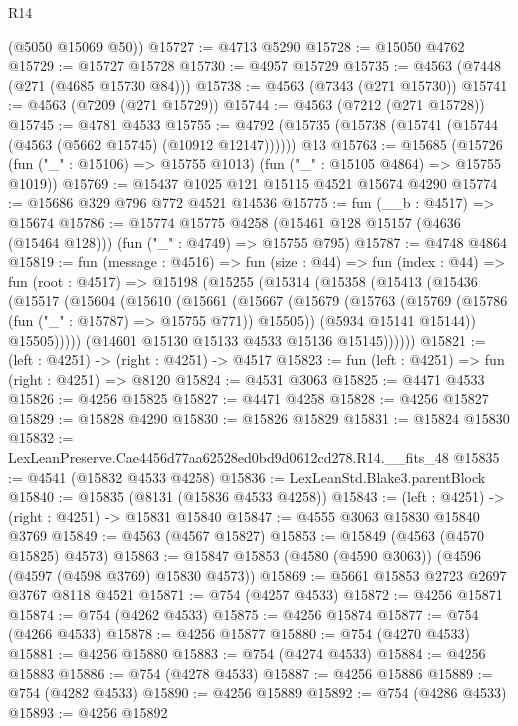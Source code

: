 \begin{lexlean}{R14}
\begin{coremodule}
      (@5050 @15069 @50))
@15727 := @4713 @5290
@15728 := @15050 @4762
@15729 := @15727 @15728
@15730 := @4957 @15729
@15735 := @4563 (@7448 (@271 (@4685 @15730 @84)))
@15738 := @4563 (@7343 (@271 @15730))
@15741 := @4563 (@7209 (@271 @15729))
@15744 := @4563 (@7212 (@271 @15728))
@15745 := @4781 @4533
@15755 := @4792 (@15735 (@15738 (@15741 (@15744 (@4563 (@5662 @15745) (@10912 @12147)))))) @13
@15763 := @15685
    (@15726 (fun ("_" : @15106) => @15755 @1013) (fun ("_" : @15105 @4864) => @15755 @1019))
@15769 := @15437 @1025 @121 @15115 @4521 @15674 @4290
@15774 := @15686 @329 @796 @772 @4521 @14536
@15775 := fun (__b : @4517) => @15674
@15786 := @15774
    @15775
    @4258
    (@15461 @128 @15157 (@4636 (@15464 @128)))
    (fun ("_" : @4749) => @15755 @795)
@15787 := @4748 @4864
@15819 := fun (message : @4516) =>
  fun (size : @44) =>
  fun (index : @44) =>
  fun (root : @4517) =>
  @15198
    (@15255
      (@15314
        (@15358
          (@15413
            (@15436
              (@15517
                (@15604
                  (@15610
                    (@15661
                      (@15667
                        (@15679
                          (@15763 (@15769 (@15786 (fun ("_" : @15787) => @15755 @771)) @15505))
                          (@5934 @15141 @15144))
                        @15505)))))
              (@14601 @15130 @15133 @4533 @15136 @15145))))))
@15821 := (left : @4251) -> (right : @4251) -> @4517
@15823 := fun (left : @4251) => fun (right : @4251) => @8120
@15824 := @4531 @3063
@15825 := @4471 @4533
@15826 := @4256 @15825
@15827 := @4471 @4258
@15828 := @4256 @15827
@15829 := @15828 @4290
@15830 := @15826 @15829
@15831 := @15824 @15830
@15832 := LexLeanPreserve.Cae4456d77aa62528ed0bd9d0612cd278.R14.__fits_48
@15835 := @4541 (@15832 @4533 @4258)
@15836 := LexLeanStd.Blake3.parentBlock
@15840 := @15835 (@8131 (@15836 @4533 @4258))
@15843 := (left : @4251) -> (right : @4251) -> @15831 @15840
@15847 := @4555 @3063 @15830 @15840 @3769
@15849 := @4563 (@4567 @15827)
@15853 := @15849 (@4563 (@4570 @15825) @4573)
@15863 := @15847 @15853 (@4580 (@4590 @3063)) (@4596 (@4597 (@4598 @3769) @15830 @4573))
@15869 := @5661 @15853 @2723 @2697 @3767 @8118 @4521
@15871 := @754 (@4257 @4533)
@15872 := @4256 @15871
@15874 := @754 (@4262 @4533)
@15875 := @4256 @15874
@15877 := @754 (@4266 @4533)
@15878 := @4256 @15877
@15880 := @754 (@4270 @4533)
@15881 := @4256 @15880
@15883 := @754 (@4274 @4533)
@15884 := @4256 @15883
@15886 := @754 (@4278 @4533)
@15887 := @4256 @15886
@15889 := @754 (@4282 @4533)
@15890 := @4256 @15889
@15892 := @754 (@4286 @4533)
@15893 := @4256 @15892

\end{coremodule}
\end{lexlean}

